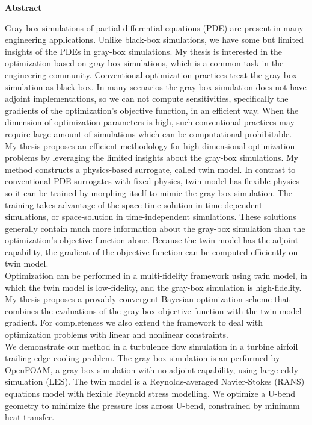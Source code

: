 \documentclass[a4paper,onecolumn]{article}
\theoremstyle{remark}
\begin{document}
\setcounter{page}{1}

$$ $$
\newpage
\hspace{.4\textwidth}
\Large\textbf{Abstract}\\
\normalsize

\noindent Gray-box simulations of partial differential equations (PDE) are
present in many engineering applications. 
Unlike black-box simulations, we have some but limited
insights of the PDEs in gray-box simulations.
My thesis is interested in the optimization based on gray-box simulations,
which is a common task in the engineering community.
Conventional optimization practices treat the gray-box simulation
as black-box. In many scenarios the gray-box simulation does not have adjoint implementations,
so we can not compute sensitivities, specifically the gradients of 
the optimization's objective function, in an efficient way. 
When the dimension of optimization parameters is high,
such conventional practices may require large amount of simulations which can be 
computational prohibitable.\\

\noindent My thesis proposes an efficient methodology for
high-dimensional optimization problems by leveraging the limited insights
about the gray-box simulations. My method constructs a physics-based surrogate, 
called twin model.
In contrast to conventional PDE surrogates with fixed-physics, twin model has
flexible physics so it can be trained by morphing itself 
to mimic the gray-box simulation. The training takes advantage of the 
space-time solution in time-dependent simulations, or space-solution in time-independent
simulations. These solutions generally contain much more information 
about the gray-box simulation than the optimization's objective function alone.
Because the twin model has the adjoint capability, the gradient of the objective function
can be computed efficiently on twin model.\\

\noindent Optimization can be performed in a multi-fidelity framework using twin model, in which
the twin model is low-fidelity, and the gray-box simulation is high-fidelity.
My thesis proposes a provably convergent Bayesian optimization scheme that combines
the evaluations of the gray-box objective function with the twin model gradient.
For completeness we also extend the framework to deal with optimization problems 
with linear and nonlinear constraints.
\\

\noindent We demonstrate our method in a turbulence flow simulation in a turbine airfoil
trailing edge cooling problem. The gray-box
simulation is an performed by OpenFOAM, a gray-box simulation with no adjoint capability,
using large eddy simulation (LES). The twin model is a Reynolds-averaged Navier-Stokes (RANS)
equations model with flexible Reynold stress modelling. We optimize a U-bend
geometry to minimize the pressure loss across U-bend, constrained by minimum heat transfer.
\end{document}
